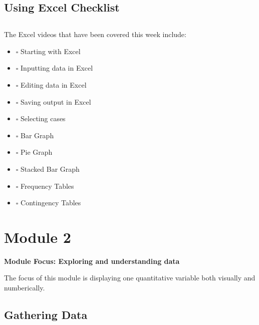 \documentclass[
  11pt,
  oneside]{scrbook}
\providecommand{\tightlist}{%
  \setlength{\itemsep}{0pt}\setlength{\parskip}{0pt}}
\begin{document}
\section*{Using Excel Checklist}\label{using-excel-checklist}

\section*{}

The Excel videos that have been covered this week include:

\begin{itemize}
\tightlist
\item
  \(\square\) Starting with Excel\\
\item
  \(\square\) Inputting data in Excel\\
\item
  \(\square\) Editing data in Excel\\
\item
  \(\square\) Saving output in Excel\\
\item
  \(\square\) Selecting cases\\
\item
  \(\square\) Bar Graph\\
\item
  \(\square\) Pie Graph\\
\item
  \(\square\) Stacked Bar Graph\\
\item
  \(\square\) Frequency Tables\\
\item
  \(\square\) Contingency Tables
\end{itemize}

\chapter{Module 2}\label{module-2}

\begin{bannerbox}
\textbf{Module Focus: Exploring and understanding data}

The focus of this module is displaying one quantitative variable both visually and numberically.
\end{bannerbox}

\section{Gathering Data}\label{gathering-data}
\end{document}
